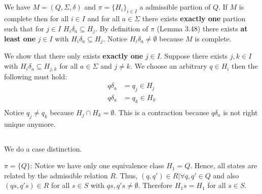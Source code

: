 \documentclass[a4paper,12pt,numbers=noenddot]{scrreport}
\begin{document}

\setcounter{chapter}{4}
\chapter{}
\section{}
We have $M = (Q, \Sigma, \delta)$ and $\pi = \{H_i\}_{i \in I}$ a admissible partion of $Q$.
If $M$ is complete then for all $i \in I$ and for all $a \in \Sigma$ there exists \textbf{exactly one} partion such that for $j \in I$ $H_i\delta_a \subseteq H_j$.
By definition of $\pi$ (Lemma 3.48) there exists \textbf{at least one} $j \in I$ with $H_i\delta_a \subseteq H_j$.
Notice $H_i\delta_a \neq \emptyset$ because $M$ is complete.

We show that there only exists \textbf{exactly one} $j \in I$.
Suppose there exists $j,k \in I$ with $H_i\delta_a \subseteq H_{j,k}$ for all $a \in \Sigma$ and $j \neq k$.
We choose an arbitrary $q \in H_i$ then the following must hold:
\begin{align*}
    q\delta_a &= q_j \in H_j \\
    q\delta_a &= q_k \in H_k \\
\end{align*}
Notice $q_j \neq q_k$ because $H_j \cap H_k = \emptyset$.
This is a contraction because $q\delta_a$ is not right unique anymore.

\section{}
We do a case distinction.

$\pi = \{Q\}$:
Notice we have only one equivalence class $H_1 = Q$.
Hence, all states are related by the admissible relation $R$.
Thus, $(q,q') \in R | \forall q,q' \in Q$ and also $(qs, q's) \in R$ for all $s \in S$ with $qs,q's \neq \emptyset$.
Therefore $H_1s = H_1$ for all $s \in S$.
\end{document}
